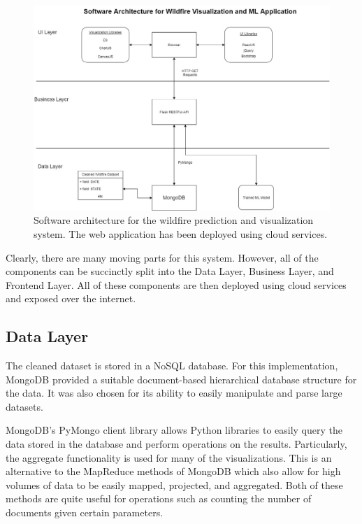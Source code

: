 \documentclass[conference]{IEEEtran}
\begin{document}
\begin{figure}
    \centering
    \includegraphics[scale=0.2]{img/software_architecture.jpg}
    \caption{Software architecture for the wildfire prediction and visualization system. The web application has been deployed using cloud services.}
    \label{fig:software_architecture}
\end{figure}

Clearly, there are many moving parts for this system. However, all of the components can be succinctly split into the Data Layer, Business Layer, and Frontend Layer. All of these components are then deployed using cloud services and exposed over the internet. \par

\subsection{Data Layer}
The cleaned dataset is stored in a NoSQL database. For this implementation, MongoDB provided a suitable document-based hierarchical database structure for the data. It was also chosen for its ability to easily manipulate and parse large datasets. \par

MongoDB's PyMongo client library allows Python libraries to easily query the data stored in the database and perform operations on the results. Particularly, the aggregate functionality is used for many of the visualizations. This is an alternative to the MapReduce methods of MongoDB which also allow for high volumes of data to be easily mapped, projected, and aggregated. Both of these methods are quite useful for operations such as counting the number of documents given certain parameters. \par
\end{document}
